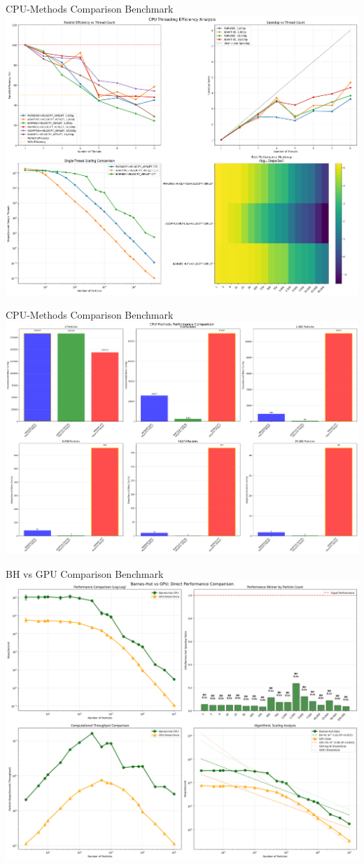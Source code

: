 \documentclass{beamer}
\begin{document}
\begin{frame}{CPU-Methods Comparison Benchmark}
    \centering
    \includegraphics[width=0.85\linewidth]{figures/CPU_methods_heatmap.png}
\end{frame}

\begin{frame}{CPU-Methods Comparison Benchmark}
    \centering
    \includegraphics[width=0.99\linewidth]{figures/CPU_methods_hist.png}
\end{frame}

\begin{frame}{BH vs GPU Comparison Benchmark}
    \centering
    \includegraphics[width=0.85\linewidth]{figures/BH_GPU_perf.png}
\end{frame}
\end{document}

